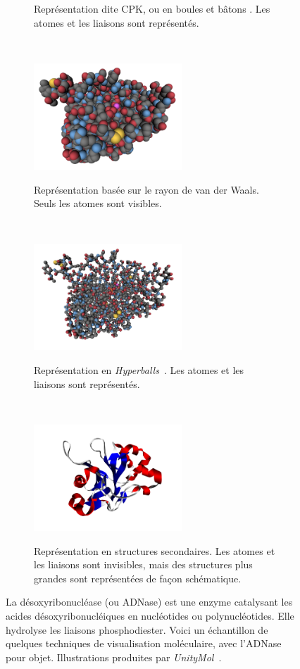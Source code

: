 \begin{figure}[H]
\begin{subfigure}[t]{\subImgW}
            \caption{Représentation dite CPK, ou en \og boules et bâtons \fg{}. Les atomes et les liaisons sont représentés.}
            \label{fig:4awn_CPK}
        \end{subfigure}
        ~
        \begin{subfigure}[t]{\subImgW}
            \centering
            {\includegraphics[height=4cm]{./figures/ch1/4awn_vdW}}
            \caption{Représentation basée sur le rayon de van der Waals. Seuls les atomes sont visibles.}
            \label{fig:4awn_VdW}
        \end{subfigure}
        ~
        \begin{subfigure}[t]{\subImgW}
            \centering
            {\includegraphics[height=4cm]{./figures/ch1/4awn_HB}}
            \caption{Représentation en \emph{Hyperballs}~\cite{chavent2011gpu}. Les atomes et les liaisons sont représentés.}
            \label{fig:4awn_HB}
        \end{subfigure}
        ~
        \begin{subfigure}[t]{\subImgW}
            \centering
            {\includegraphics[height=4cm]{./figures/ch1/4awn_ss}}
            \caption{Représentation en structures secondaires. Les atomes et les liaisons sont invisibles, mais des structures plus grandes sont représentées de façon schématique.}
            \label{fig:4awn_ss}
        \end{subfigure}
        \caption{La désoxyribonucléase (ou ADNase) est une enzyme catalysant les acides désoxyribonucléiques en nucléotides ou polynucléotides. Elle hydrolyse les liaisons phosphodiester. Voici un échantillon de quelques techniques de visualisation moléculaire, avec l'ADNase pour objet. Illustrations produites par \emph{UnityMol}~\cite{doutreligne2014unitymol}.}
        \label{fig:4awn_atom}
    \end{figure}
    
